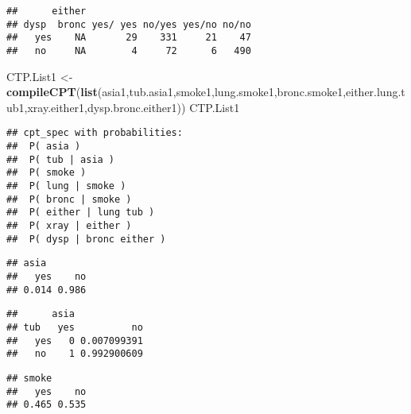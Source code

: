 \documentclass[
]{article}
\newenvironment{Shaded}{\begin{snugshade}}{\end{snugshade}}
\newcommand{\KeywordTok}[1]{\textcolor[rgb]{0.13,0.29,0.53}{\textbf{#1}}}
\newcommand{\NormalTok}[1]{#1}
\newcommand{\OperatorTok}[1]{\textcolor[rgb]{0.81,0.36,0.00}{\textbf{#1}}}
\newcommand{\StringTok}[1]{\textcolor[rgb]{0.31,0.60,0.02}{#1}}
\begin{document}
\begin{verbatim}
##      either
## dysp  bronc yes/ yes no/yes yes/no no/no
##   yes    NA       29    331     21    47
##   no     NA        4     72      6   490
\end{verbatim}

\begin{Shaded}
\begin{Highlighting}[]
\NormalTok{CTP.List1 <-}\StringTok{ }\KeywordTok{compileCPT}\NormalTok{(}\KeywordTok{list}\NormalTok{(asia1,tub.asia1,smoke1,lung.smoke1,bronc.smoke1,either.lung.tub1,xray.either1,dysp.bronc.either1))}
\NormalTok{CTP.List1}
\end{Highlighting}
\end{Shaded}

\begin{verbatim}
## cpt_spec with probabilities:
##  P( asia )
##  P( tub | asia )
##  P( smoke )
##  P( lung | smoke )
##  P( bronc | smoke )
##  P( either | lung tub )
##  P( xray | either )
##  P( dysp | bronc either )
\end{verbatim}

\begin{Shaded}
\end{Shaded}

\begin{verbatim}
## asia
##   yes    no 
## 0.014 0.986
\end{verbatim}

\begin{Shaded}
\end{Shaded}

\begin{verbatim}
##      asia
## tub   yes          no
##   yes   0 0.007099391
##   no    1 0.992900609
\end{verbatim}

\begin{Shaded}
\end{Shaded}

\begin{verbatim}
## smoke
##   yes    no 
## 0.465 0.535
\end{verbatim}
\end{document}
